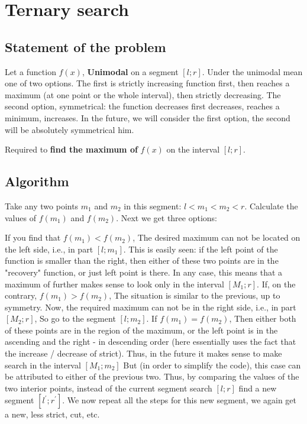 \section{ Ternary search }
\subsection{ Statement of the problem }

Let a function $f (x)$, \textbf{Unimodal} on a segment $[l; r]$. Under the unimodal mean one of two options. The first is strictly increasing function first, then reaches a maximum (at one point or the whole interval), then strictly decreasing. The second option, symmetrical: the function decreases first decreases, reaches a minimum, increases. In the future, we will consider the first option, the second will be absolutely symmetrical him.

Required to \textbf{find the maximum of} $f (x)$ on the interval $[l; r]$.

\subsection{ Algorithm }

Take any two points $m_1$ and $m_2$ in this segment: $l <m_1 <m_2 <r$. Calculate the values ​​of $f (m_1)$ and $f (m_2)$. Next we get three options:

If you find that $f (m_1) <f (m_2)$, The desired maximum can not be located on the left side, i.e., in part $[l; m_1]$. This is easily seen: if the left point of the function is smaller than the right, then either of these two points are in the "recovery" function, or just left point is there. In any case, this means that a maximum of further makes sense to look only in the interval $[M_1; r]$.
If, on the contrary, $f (m_1)> f (m_2)$, The situation is similar to the previous, up to symmetry. Now, the required maximum can not be in the right side, i.e., in part $[M_2; r]$, So go to the segment $[l; m_2]$.
If $f (m_1) = f (m_2)$, Then either both of these points are in the region of the maximum, or the left point is in the ascending and the right - in descending order (here essentially uses the fact that the increase / decrease of strict). Thus, in the future it makes sense to make search in the interval $[M_1; m_2]$ But (in order to simplify the code), this case can be attributed to either of the previous two.
Thus, by comparing the values ​​of the two interior points, instead of the current segment search $[l; r]$ find a new segment $[l ^ \prime; r ^ \prime]$. We now repeat all the steps for this new segment, we again get a new, less strict, cut, etc.

